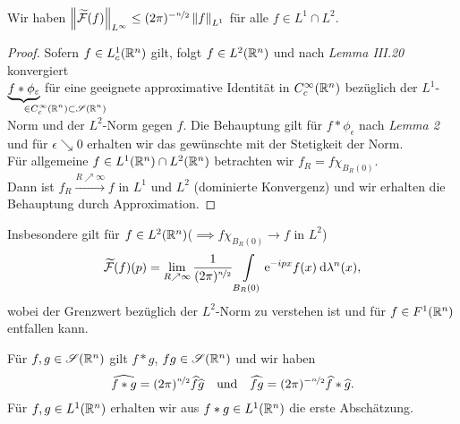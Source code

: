 \documentclass[skript.tex]{subfiles}
\begin{document}
	\begin{lem}
		Wir haben $\left\lVert \widetilde{\mathcal{F}}(f) \right\rVert_{L^\infty} \leq (2\pi)^{-\nicefrac{n}{2}} \left\lVert f \right\rVert_{L^1}$ für alle $f \in L^1 \cap L^2$.
	\end{lem}
	\begin{proof}
		Sofern $f \in L_c^1(\mathbb{R}^n)$ gilt, folgt $f \in L^2(\mathbb{R}^n)$ und nach \emph{Lemma III.20} konvergiert\\ $\underbrace{f \ast \phi_\epsilon}_{\mathrlap{\in C_c^\infty(\R^n)\sbs\ms{S}(\R^n)}}$ für eine geeignete approximative Identität in $C_c^\infty(\mathbb{R}^n)$ bezüglich der $L^1$-Norm und der $L^2$-Norm gegen $f$. Die Behauptung gilt für $f \ast \phi_\epsilon$ nach \emph{Lemma 2} und für $\epsilon \searrow 0$ erhalten wir das gewünschte mit der Stetigkeit der Norm.\\
		Für allgemeine $f \in L^1(\mathbb{R}^n) \cap L^2(\mathbb{R}^n)$ betrachten wir $f_R=f\chi_{B_R(0)}$.\\ %
		Dann ist $f_R\xrightarrow{R\nearrow\infty}f$ in $L^1$ und $L^2$ (dominierte Konvergenz) und wir erhalten die Behauptung durch Approximation.
	\end{proof}
	Insbesondere gilt für $f \in L^2(\mathbb{R}^n)$\quad($\implies  f\chi_{B_R(0)} \to f$ in $L^2$)
	\[
		\widetilde{\mathcal{F}}(f)(p) = \lim_{R\nearrow\infty} \frac{1}{(2\pi)^{\nicefrac{n}{2}}} \int\limits_{B_R(0)} \mathrm{e}^{-ipx} f(x) \: \mathrm{d}\lambda^n(x),
	\]
	wobei der Grenzwert bezüglich der $L^2$-Norm zu verstehen ist und für $f \in F^1(\mathbb{R}^n)$ entfallen kann.
	\begin{lem}
		Für $f,g\in\mathscr{S}(\mathbb{R}^n)$ gilt $f \ast g$, $fg\in\mathscr{S}(\mathbb{R}^n)$ und wir haben
		\[
			\widehat{f \ast g} = (2\pi)^{\nicefrac{n}{2}} \widehat{f}\widehat{g} \quad\text{und}\quad \widehat{fg}=(2\pi)^{-\nicefrac{n}{2}}\widehat{f}\ast\widehat{g}.
		\]
		Für $f,g \in L^1(\mathbb{R}^n)$ erhalten wir aus $f \ast g \in L^1(\mathbb{R}^n)$ die erste Abschätzung.
	\end{lem}
\end{document}

